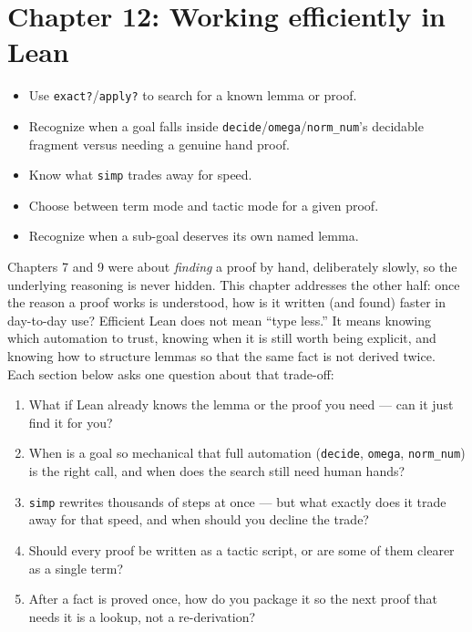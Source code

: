 \chapter{Chapter 12: Working efficiently in Lean}\label{sec:12-working-efficiently:00-index:1}

\begin{learningobjectives}
\begin{itemize}
\tightlist
\item
  Use \texttt{exact?}/\texttt{apply?} to search for a known lemma or proof.
\item
  Recognize when a goal falls inside \texttt{decide}/\texttt{omega}/\texttt{norm\_\allowbreak{}num}'s decidable fragment versus needing a genuine hand proof.
\item
  Know what \texttt{simp} trades away for speed.
\item
  Choose between term mode and tactic mode for a given proof.
\item
  Recognize when a sub-goal deserves its own named lemma.
\end{itemize}
\end{learningobjectives}


Chapters 7 and 9 were about \emph{finding} a proof by hand, deliberately slowly, so the underlying reasoning is never hidden. This chapter addresses the other half: once the reason a proof works is understood, how is it written (and found) faster in day-to-day use? Efficient Lean does not mean ``type less.'' It means knowing which automation to trust, knowing when it is still worth being explicit, and knowing how to structure lemmas so that the same fact is not derived twice. Each section below asks one question about that trade-off:

\begin{enumerate}
\def\labelenumi{\arabic{enumi}.}
\tightlist
\item
  What if Lean already knows the lemma or the proof you need --- can it just find it for you?
\item
  When is a goal so mechanical that full automation (\texttt{decide}, \texttt{omega}, \texttt{norm\_\allowbreak{}num}) is the right call, and when does the search still need human hands?
\item
  \texttt{simp} rewrites thousands of steps at once --- but what exactly does it trade away for that speed, and when should you decline the trade?
\item
  Should every proof be written as a tactic script, or are some of them clearer as a single term?
\item
  After a fact is proved once, how do you package it so the next proof that needs it is a lookup, not a re-derivation?
\end{enumerate}







